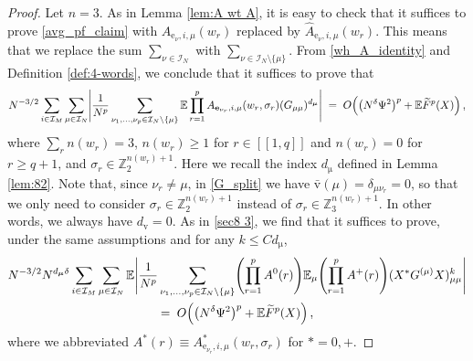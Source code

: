 \documentclass[11pt]{article} %
\numberwithin{equation}{section}
\numberwithin{figure}{section}
\theoremstyle{plain} %
\theoremstyle{definition} %
\newcommand{\f}[1]{\boldsymbol{\mathrm{#1}}} %
\renewcommand{\cal}{\mathcal}
\newcommand{\wh}{\widehat}
\newcommand{\wt}{\widetilde}
\newcommand{\E}{\mathbb{E}}
\newcommand{\Z}{\mathbb{Z}}
\renewcommand{\leq}{\leqslant}
\renewcommand{\geq}{\geqslant}
\newcommand{\qq}[1]{[\![{#1}]\!]}
\newcommand{\pb}[1]{\bigl({#1}\bigr)}
\newcommand{\pB}[1]{\Bigl({#1}\Bigr)}
\newcommand{\pBB}[1]{\Biggl({#1}\Biggr)}
\newcommand{\absBB}[1]{\Biggl\lvert #1 \Biggr\rvert}
\begin{document}
\begin{proof}
Let $n = 3$. As in Lemma \ref{lem:A wt A}, it is easy to check that it suffices to prove \eqref{avg_pf_claim} with $A_{\f e_\nu,i, \mu}(w_r)$ replaced by $\wh A_{\f e_\nu,i, \mu}(w_r)$. This means that we replace the sum $\sum_{\nu \in \cal I_N}$ with $\sum_{\nu \in \cal I_N \setminus \{\mu\}}$. From \eqref{wh_A_identity} and Definition \ref{def:4-words}, we conclude that it suffices to prove that
\begin{equation*}
N^{-3/2} \sum_{i \in \cal I_M} \sum_{\mu \in \cal I_N} \absBB{\frac{1}{N^p} \sum_{\nu_1, \dots, \nu_p \in \cal I_N \setminus \{\mu\}} \E \prod_{r = 1}^{p} A_{\f e_{\nu_r},i, \mu}(w_r, \sigma_r) (G_{\mu \mu})^{d_{\f \mu}}}  \;=\; O \pB{\pb{N^{\delta}\Psi^2}^p+\E \wt F^p(X)}\,,
\end{equation*}
where $\sum_r n(w_r) = 3$, $n(w_r) \geq 1$ for $r \in \qq{1,q}$ and $n(w_r) = 0$ for $r \geq q+1$, and $\sigma_r \in \Z_2^{n(w_r) + 1}$. Here we recall the index $d_{\f \mu}$ defined in Lemma \ref{lem:82}. Note that, since $\nu_r \neq \mu$, in \eqref{G_split} we have $\bar {\f v}(\mu) = \delta_{\mu \nu_r} = 0$, so that we only need to consider $\sigma_r \in \Z_2^{n(w_r) + 1}$ instead of $\sigma_r \in \Z_3^{n(w_r) + 1}$. In other words, we always have $d_{\f v} = 0$. As in \eqref{sec8 3}, we find that it suffices to prove, under the same assumptions and for any $k \leq C d_{\f \mu}$,
\begin{multline} \label{avg_step 1}
N^{-3/2} N^{d_{\f \mu} \delta} \sum_{i \in \cal I_M} \sum_{\mu \in \cal I_N} \E \absBB{\frac{1}{N^p} \sum_{\nu_1, \dots, \nu_p \in \cal I_N \setminus \{\mu\}} \pBB{\prod_{r = 1}^{p} A^0(r)} \E_\mu \pBB{\prod_{r = 1}^{p} A^{+}(r)} (X^* G^{(\mu)} X)_{\mu \mu}^k}
\\
=\; O \pB{\pb{N^{\delta}\Psi^2}^p+\E \wt F^p(X)}\,,
\end{multline}
where we abbreviated $A^{*}(r) \equiv A^{*}_{\f e_{\nu_r},i,\mu}(w_r, \sigma_r)$ for $* = 0,+$.


\end{proof}
\end{document}
